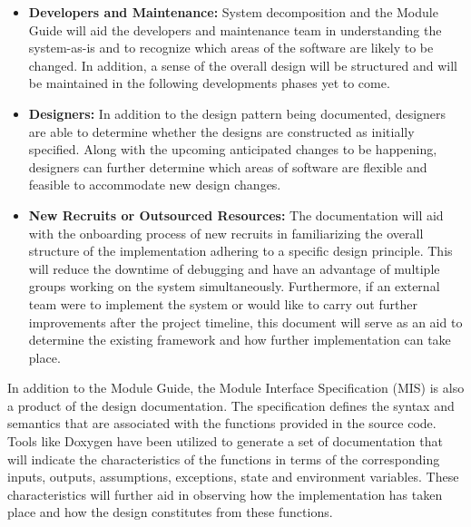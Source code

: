 \documentclass{article}
\begin{document}
\begin{itemize}
    \item \textbf{Developers and Maintenance:} System decomposition and the Module Guide will aid the developers and maintenance team in understanding the system-as-is and to recognize which areas of the software are likely to be changed. In addition, a sense of the overall design will be structured and will be maintained in the following developments phases yet to come.
    \item \textbf{Designers:} In addition to the design pattern being documented, designers are able to determine whether the designs are constructed as initially specified. Along with the upcoming anticipated changes to be happening, designers can further determine which areas of software are flexible and feasible to accommodate new design changes.
    \item \textbf{New Recruits or Outsourced Resources:} The documentation will aid with the onboarding process of new recruits in familiarizing the overall structure of the implementation adhering to a specific design principle. This will reduce the downtime of debugging and have an advantage of multiple groups working on the system simultaneously. Furthermore, if an external team were to implement the system or would like to carry out further improvements after the project timeline, this document will serve as an aid to determine the existing framework and how further implementation can take place.
\end{itemize}

\noindent
In addition to the Module Guide, the Module Interface Specification (MIS) is also a product of the design documentation. The specification defines the syntax and semantics that are associated with the functions provided in the source code. Tools like Doxygen have been utilized to generate a set of documentation that will indicate the characteristics of the functions in terms of the corresponding inputs, outputs, assumptions, exceptions, state and environment variables. These characteristics will further aid in observing how the implementation has taken place and how the design constitutes from these functions.
\end{document}
